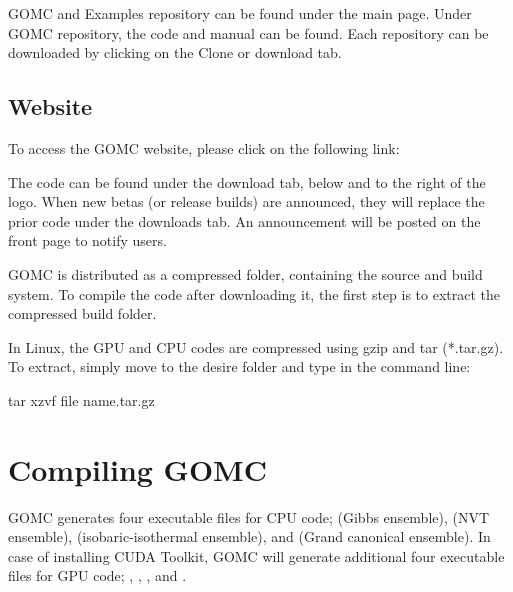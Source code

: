 \documentclass[letterpaper,10pt,english]{sphinxmanual}
\begin{document}

\noindent{}

GOMC and Examples repository can be found under the main page. Under GOMC repository, the code and manual can be found. Each repository can be downloaded by clicking on the Clone or download tab.

\noindent{}


\section{Website}
\label{\detokenize{download:website}}
To access the GOMC website, please click on the following link:

The code can be found under the download tab, below and to the right of the logo. When new betas (or release builds) are announced, they will replace the prior code under the downloads tab. An announcement will be posted on the front page to notify users.

\noindent{}

GOMC is distributed as a compressed folder, containing the source and build system. To compile the code after downloading it, the first step is to extract the compressed build folder.

In Linux, the GPU and CPU codes are compressed using gzip and tar (*.tar.gz). To extract, simply move to the desire folder and type in the command line:

%
\begin{sphinxVerbatim}[commandchars=\\\{\}]
\PYGZdl{} tar \PYGZhy{}xzvf \PYGZlt{}file name\PYGZgt{}.tar.gz
\end{sphinxVerbatim}


\chapter{Compiling GOMC}
\label{\detokenize{compiling:compiling-gomc}}\label{\detokenize{compiling::doc}}
GOMC generates four executable files for CPU code;  (Gibbs ensemble),  (NVT ensemble),  (isobaric-isothermal ensemble), and  (Grand canonical ensemble). In case of installing CUDA Toolkit, GOMC will generate additional four executable files for GPU code; , , , and .
\end{document}
